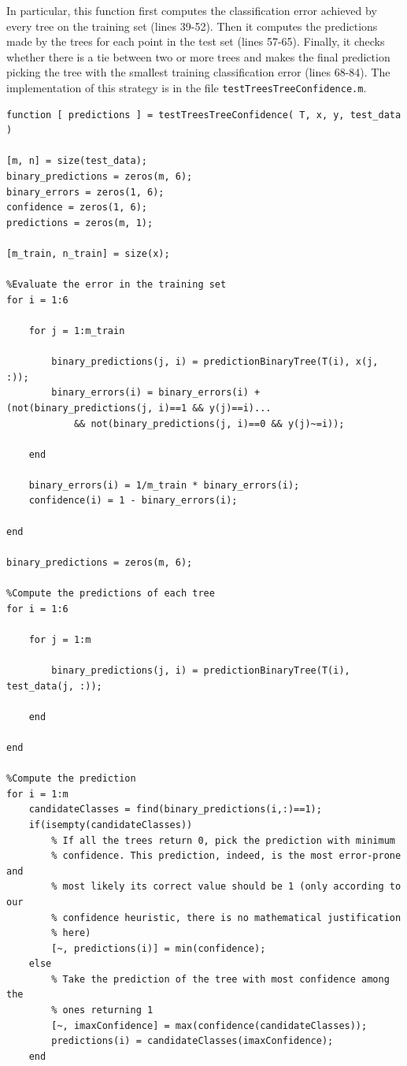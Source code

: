 \documentclass{article}
\begin{document}
In particular, this function first computes the classification error achieved by every tree on the training set (lines 39-52). Then it computes the predictions made by the trees for each point in the test set (lines 57-65). Finally, it checks whether there is a tie between two or more trees and makes the final prediction picking the tree with the smallest training classification error (lines 68-84). The implementation of this strategy is in the file \verb$testTreesTreeConfidence.m$.

\begin{lstlisting}[firstnumber=28]
function [ predictions ] = testTreesTreeConfidence( T, x, y, test_data )

[m, n] = size(test_data);
binary_predictions = zeros(m, 6);
binary_errors = zeros(1, 6);
confidence = zeros(1, 6);
predictions = zeros(m, 1);

[m_train, n_train] = size(x);

%Evaluate the error in the training set
for i = 1:6

    for j = 1:m_train
        
        binary_predictions(j, i) = predictionBinaryTree(T(i), x(j, :));
        binary_errors(i) = binary_errors(i) + (not(binary_predictions(j, i)==1 && y(j)==i)...
            && not(binary_predictions(j, i)==0 && y(j)~=i));
   
    end
    
    binary_errors(i) = 1/m_train * binary_errors(i);
    confidence(i) = 1 - binary_errors(i);

end

binary_predictions = zeros(m, 6);

%Compute the predictions of each tree
for i = 1:6

    for j = 1:m
        
        binary_predictions(j, i) = predictionBinaryTree(T(i), test_data(j, :));
   
    end

end

%Compute the prediction
for i = 1:m
    candidateClasses = find(binary_predictions(i,:)==1);
    if(isempty(candidateClasses))
        % If all the trees return 0, pick the prediction with minimum
        % confidence. This prediction, indeed, is the most error-prone and
        % most likely its correct value should be 1 (only according to our
        % confidence heuristic, there is no mathematical justification
        % here)
        [~, predictions(i)] = min(confidence);
    else
        % Take the prediction of the tree with most confidence among the
        % ones returning 1
        [~, imaxConfidence] = max(confidence(candidateClasses));
        predictions(i) = candidateClasses(imaxConfidence);
    end


\end{lstlisting}
\end{document}
